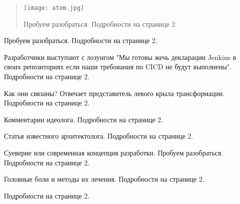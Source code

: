 \documentclass{article}
\date{\today}
\begin{document}
\maketitle

\begin{abstract}

\texttt{[image: atom.jpg]}

Пробуем разобраться.
Подробности на странице 2.
\vspace{10mm}
\closearticle

\end{abstract}

\begin{multicols}{3}

Пробуем разобраться.
Подробности на странице 2.
\vspace{5mm}
\closearticle

Разработчики выступают с лозунгом "Мы готовы жечь декларации Jenkins в своих репозиториях если наши требования по CICD не будут выполнены".
Подробности на странице 2.
\vspace{5mm}
\closearticle

Как они связаны? Отвечает представитель левого крыла трансформации.
Подробности на странице 2.
\closearticle

\end{multicols}

\begin{multicols}{3}

Комментарии идеолога.
Подробности на странице 2.
\closearticle

Статья известного архитектолога.
Подробности на странице 2.
\vspace{5mm}
\closearticle

Суеверие или современная концепция разработки. Пробуем разобраться.
Подробности на странице 2.
\closearticle

\end{multicols}

\begin{multicols}{3}

Головные боли и методы их лечения.
Подробности на странице 2.
\vspace{0mm}
\closearticle

Подробности на странице 2.
\vspace{30mm}
\closearticle

\end{multicols}
\end{document}
